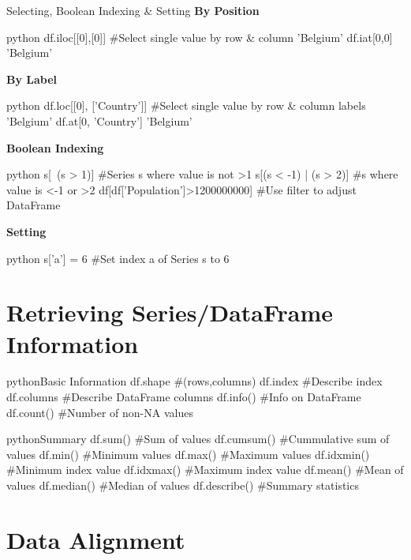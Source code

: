 \begin{myblock}{Selecting{,} Boolean Indexing \& Setting}
\textbf{By Position}
\begin{codebox}{python}{}
df.iloc[[0],[0]]  #Select single value by row & column
'Belgium'
df.iat[0,0]
'Belgium'
\end{codebox}

\textbf{By Label}
\begin{codebox}{python}{}
df.loc[[0], ['Country']]  #Select single value by row & column labels
'Belgium'
df.at[0, 'Country']
'Belgium'
\end{codebox}

\textbf{Boolean Indexing}
\begin{codebox}{python}{}
s[~(s > 1)]  #Series s where value is not >1
s[(s < -1) | (s > 2)]  #s where value is <-1 or >2
df[df['Population']>1200000000]  #Use filter to adjust DataFrame
\end{codebox}

\textbf{Setting}
\begin{codebox}{python}{}
s['a'] = 6  #Set index a of Series s to 6
\end{codebox}
\end{myblock}


\section{Retrieving Series/DataFrame Information}

\begin{codebox}{python}{Basic Information}
df.shape  #(rows,columns)
df.index  #Describe index
df.columns  #Describe DataFrame columns
df.info()  #Info on DataFrame
df.count()  #Number of non-NA values
\end{codebox}

\begin{codebox}{python}{Summary}
df.sum()  #Sum of values
df.cumsum()  #Cummulative sum of values
df.min()  #Minimum values
df.max()  #Maximum values
df.idxmin()  #Minimum index value
df.idxmax()  #Maximum index value
df.mean()  #Mean of values
df.median()  #Median of values
df.describe()  #Summary statistics
\end{codebox}


\section{Data Alignment}

